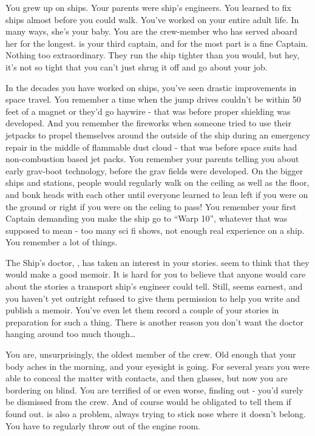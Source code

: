 \documentclass[char]{TMFHope}
\begin{document}
\name{\cEng{}}

You grew up on ships. Your parents were ship's engineers. You learned to fix ships almost before you could walk. You've worked on \pNew{} your entire adult life. In many ways, she's your baby. You are the crew-member who has served aboard her for the longest. \cCap{} is your third captain, and for the most part is a fine Captain. Nothing too extraordinary. They run the ship tighter than you would, but hey, it's not so tight that you can't just shrug it off and go about your job.

In the decades you have worked on ships, you've seen drastic improvements in space travel. You remember a time when the jump drives couldn't be within 50 feet of a magnet or they'd go haywire - that was before proper shielding was developed. And you remember the fireworks when someone tried to use their jetpacks to propel themselves around the outside of the ship during an emergency repair in the middle of flammable dust cloud - that was before space suits had non-combustion based jet packs. You remember your parents telling you about early grav-boot technology, before the grav fields were developed. On the bigger ships and stations, people would regularly walk on the ceiling as well as the floor, and bonk heads with each other until everyone learned to lean left if you were on the ground or right if you were on the celing to pass! You remember your first Captain demanding you make the ship go to ``Warp 10'', whatever that was supposed to mean - too many sci fi shows, not enough real experience on a ship. You remember a lot of things.
 
The Ship's doctor, \cMed{}, has taken an interest in your stories. \cMed{\They} seem to think that they would make a good memoir. It is hard for you to believe that anyone would care about the stories a transport ship's engineer could tell. Still, \cMed{} seems earnest, and you haven't yet outright refused to give them permission to help you write and publish a memoir. You've even let them record a couple of your stories in preparation for such a thing. There is another reason you don't want the doctor hanging around too much though\ldots

You are, unsurprisingly, the oldest member of the crew. Old enough that your body aches in the morning, and your eyesight is going. For several years you were able to conceal the matter with contacts, and then glasses, but now you are bordering on blind. You are terrified of \cCap{} or even worse, \cXO{} finding out - you'd surely be dismissed from the crew. And of course \cMed{} would  be obligated to tell them if \cMed{\they} found out. \cWeap{} is also a problem, always trying to stick \cWeap{\their} nose where it doesn't belong. You have to regularly throw \cWeap{\them} out of the engine room.
\end{document}

